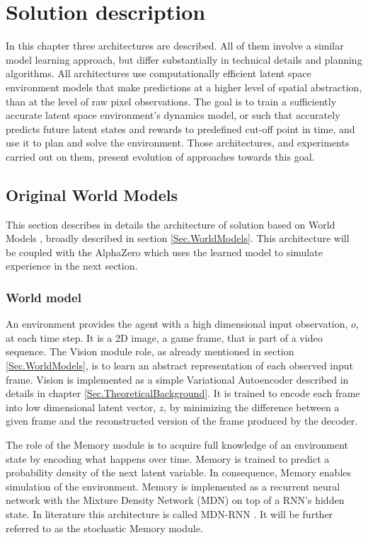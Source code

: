 \section{Solution description} \label{Sec.SolutionDescription}

In this chapter three architectures are described. All of them involve a similar model learning approach, but differ substantially in technical details and planning algorithms. All architectures use computationally efficient latent space environment models that make predictions at a higher level of spatial abstraction, than at the level of raw pixel observations. The goal is to train a sufficiently accurate latent space environment's dynamics model, or such that accurately predicts future latent states and rewards to predefined cut-off point in time, and use it to plan and solve the environment. Those architectures, and experiments carried out on them, present evolution of approaches towards this goal.

\subsection{Original World Models}

This section describes in details the architecture of solution based on World Models \cite{Algo.WorldModels}, broadly described in section \ref{Sec.WorldModels}. This architecture will be coupled with the AlphaZero which uses the learned model to simulate experience in the next section.

\subsubsection{World model}

An environment provides the agent with a high dimensional input observation, $o$, at each time step. It is a 2D image, a game frame, that is part of a video sequence. The Vision module role, as already mentioned in section \ref{Sec.WorldModels}, is to learn an abstract representation of each observed input frame. Vision is implemented as a simple Variational Autoencoder described in details in chapter \ref{Sec.TheoreticalBackground}. It is trained to encode each frame into low dimensional latent vector, $z$, by minimizing the difference between a given frame and the reconstructed version of the frame produced by the decoder.

The role of the Memory module is to acquire full knowledge of an environment state by encoding what happens over time. Memory is trained to predict a probability density of the next latent variable. In consequence, Memory enables simulation of the environment. Memory is implemented as a recurrent neural network with the Mixture Density Network (MDN) on top of a RNN's hidden state. In literature this architecture is called MDN-RNN \cite{Algo.MDNRNN}. It will be further referred to as the stochastic Memory module.

